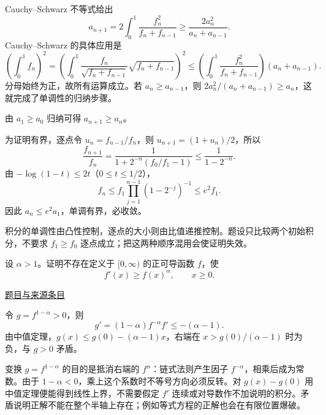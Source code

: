 \documentclass[UTF8,12pt,a4paper,fontset=fandol]{ctexart}
\begin{document}
\begin{solve}\label{ans:pre08-math:4}

Cauchy--Schwarz 不等式给出
\[
a_{n+1}=2\int_0^1\frac{f_n^2}{f_n+f_{n-1}}
\ge\frac{2a_n^2}{a_n+a_{n-1}}.
\]
Cauchy--Schwarz 的具体应用是
\[
\left(\int_0^1 f_n\right)^2
=\left(\int_0^1\frac{f_n}{\sqrt{f_n+f_{n-1}}}\sqrt{f_n+f_{n-1}}\right)^2
\le\left(\int_0^1\frac{f_n^2}{f_n+f_{n-1}}\right)(a_n+a_{n-1}).
\]
分母始终为正，故所有运算成立。若 $a_n\ge a_{n-1}$，则 $2a_n^2/(a_n+a_{n-1})\ge a_n$，这就完成了单调性的归纳步骤。

由 $a_1\ge a_0$ 归纳可得 $a_{n+1}\ge a_n$。

为证明有界，逐点令 $u_n=f_{n-1}/f_n$，则 $u_{n+1}=(1+u_n)/2$，所以
\[
\frac{f_{n+1}}{f_n}
=\frac1{1+2^{-n}(f_0/f_1-1)}
\le\frac1{1-2^{-n}}.
\]
由 $-\log(1-t)\le2t$（$0\le t\le1/2$），
\[
f_n\le f_1\prod_{j=1}^{n-1}(1-2^{-j})^{-1}\le e^2 f_1.
\]
因此 $a_n\le e^2a_1$，单调有界，必收敛。

\end{solve}

\begin{remark}[方法与条件]积分的单调性由凸性控制，逐点的大小则由比值递推控制。题设只比较两个初始积分，不要求 $f_1\ge f_0$ 逐点成立；把这两种顺序混用会使证明失效。\end{remark}

\begin{example}[来源序号5]\label{ex:pre08-math:5}\label{pr:pre08-math:5}

设 $\alpha>1$。证明不存在定义于 $[0,\infty)$ 的正可导函数 $f$，使
\[
f'(x)\ge f(x)^\alpha,\qquad x\ge0.
\]

\par\href{https://github.com/lzxcr/cmc-mathematics/blob/64916fa1fdbc3e444a652eca204d5669058ee321/src/problems/preliminary/08/05.md}{题目与来源条目}

\end{example}

\begin{solve}\label{ans:pre08-math:5}

令 $g=f^{1-\alpha}>0$，则
\[
g'=(1-\alpha)f^{-\alpha}f'\le-(\alpha-1).
\]
由中值定理，$g(x)\le g(0)-(\alpha-1)x$，右端在 $x>g(0)/(\alpha-1)$ 时为负，与 $g>0$ 矛盾。

变换 $g=f^{1-\alpha}$ 的目的是抵消右端的 $f^\alpha$：链式法则产生因子 $f^{-\alpha}$，相乘后成为常数。由于 $1-\alpha<0$，乘上这个系数时不等号方向必须反转。对 $g(x)-g(0)$ 用中值定理便能得到线性上界，不需要假定 $f'$ 连续或对导数作不加说明的积分。矛盾说明正解不能在整个半轴上存在；例如等式方程的正解也会在有限位置爆破。

\end{solve}
\end{document}
